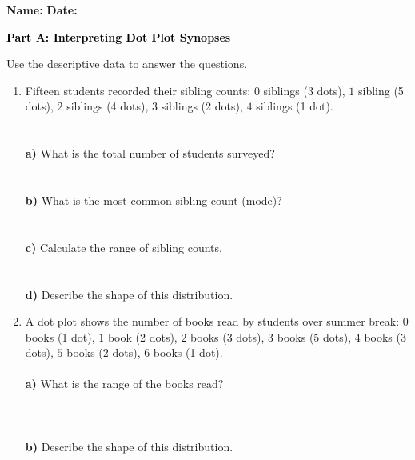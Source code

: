 \documentclass[12pt, letterpaper, fleqn]{article}
\newcommand{\blank}{\underline{\hspace{2.2cm}}}
\newcommand{\blanklong}{\underline{\hspace{6.5cm}}}
\begin{document}
\textbf{Name:} \underline{\hspace{5cm}}
\hfill
\textbf{Date:} \underline{\hspace{3cm}}\\

\begin{tcolorbox}[colback=black!10]
    \large\textcolor{black}{\textbf{Part A: Interpreting Dot Plot Synopses}}
\end{tcolorbox}

\vspace{3mm}

\noindent
Use the descriptive data to answer the questions.

\vspace{5mm}

\begin{enumerate}[itemsep=2cm, leftmargin=0.6cm]
\item Fifteen students recorded their sibling counts: $0$ siblings (3 dots), $1$ sibling (5 dots), $2$ siblings (4 dots), $3$ siblings (2 dots), $4$ siblings (1 dot). \\ \\ \\
\textbf{a)} What is the total number of students surveyed? \blank \\ \\ \\
\textbf{b)} What is the most common sibling count (mode)? \blank \\ \\ \\
\textbf{c)} Calculate the range of sibling counts. \blank \\ \\ \\
\textbf{d)} Describe the shape of this distribution. \blanklong

\item A dot plot shows the number of books read by students over summer break: $0$ books (1 dot), $1$ book (2 dots), $2$ books (3 dots), $3$ books (5 dots), $4$ books (3 dots), $5$ books (2 dots), $6$ books (1 dot). \\ \\
\textbf{a)} What is the range of the books read? \blank \\ \\ \\ \\
\textbf{b) }Describe the shape of this distribution. \blanklong \\ \\
\end{enumerate}
\end{document}
